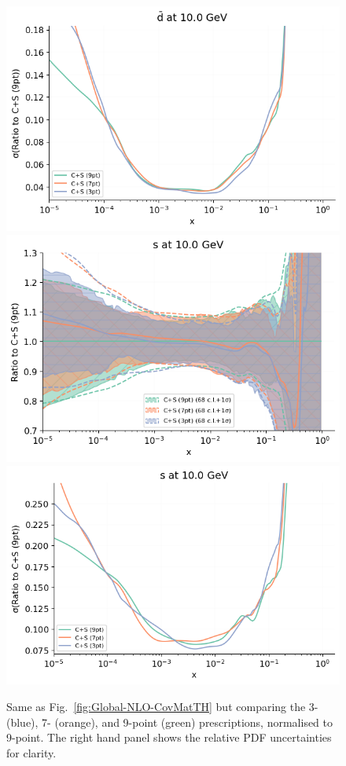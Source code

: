 \begin{figure}[H]
\begin{center}
    \includegraphics[scale=0.45]{mhous/plots/jplots/jed.png}
       \includegraphics[scale=0.44]{mhous/plots/jplots/j2s.png}
    \includegraphics[scale=0.45]{mhous/plots/jplots/jes.png}
   \caption{\small Same as Fig.~\ref{fig:Global-NLO-CovMatTH} but comparing the 3- (blue), 7- (orange), and 9-point (green) prescriptions, normalised
     to 9-point. The right hand panel shows the 
     relative PDF uncertainties for clarity.
    \label{fig:Global-NLO-CovMatTH-prescriptions} }
  \end{center}
\end{figure}
